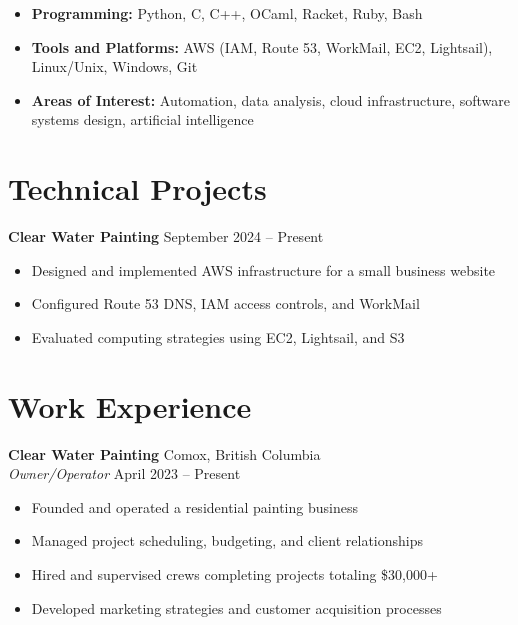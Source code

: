 \documentclass[11pt, letterpaper]{article}
\begin{document}
\begin{itemize}
    \item \textbf{Programming:} Python, C, C++, OCaml, Racket, Ruby, Bash
    \item \textbf{Tools and Platforms:} AWS (IAM, Route 53, WorkMail, EC2, Lightsail),
          Linux/Unix, Windows, Git
    \item \textbf{Areas of Interest:} Automation, data analysis, cloud infrastructure,
          software systems design, artificial intelligence
\end{itemize}

\section{Technical Projects}

\textbf{Clear Water Painting} \hfill September 2024 -- Present
\begin{itemize}
    \item Designed and implemented AWS infrastructure for a small business website
    \item Configured Route 53 DNS, IAM access controls, and WorkMail
    \item Evaluated computing strategies using EC2, Lightsail, and S3
\end{itemize}

\section{Work Experience}

\textbf{Clear Water Painting} \hfill Comox, British Columbia \\
\textit{Owner/Operator} \hfill April 2023 -- Present
\begin{itemize}
    \item Founded and operated a residential painting business
    \item Managed project scheduling, budgeting, and client relationships
    \item Hired and supervised crews completing projects totaling \$30,000+
    \item Developed marketing strategies and customer acquisition processes
\end{itemize}
\end{document}
